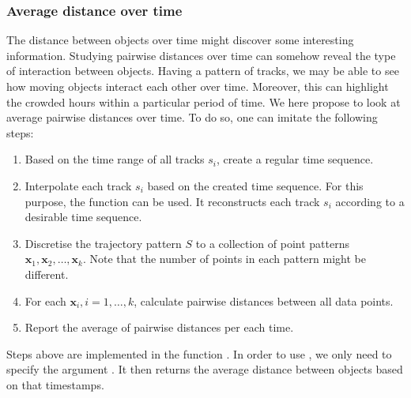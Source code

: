 \documentclass[article]{jss}
\begin{document}
\subsubsection{Average distance over time}
  The distance between objects over time might discover some interesting information. Studying pairwise distances over time can somehow reveal the type of interaction between objects. Having a pattern of tracks, we may be able to see how moving objects interact each other over time. Moreover, this can highlight the crowded hours within a particular period of time. We here propose to look at average pairwise distances over time. To do so, one can imitate the following steps:
  \begin{leftbar}
  \begin{enumerate}
  \item Based on the time range of all tracks $s_i$, create a regular time sequence.
  \item Interpolate each track $s_i$ based on the created time sequence. For this purpose, the function  can be used. It reconstructs each track $s_i$ according to a desirable time sequence.
  \item Discretise the trajectory pattern $S$ to a collection of point patterns $\mathbf{x}_1,\mathbf{x}_2, \ldots, \mathbf{x}_k$. Note that the number of points in each pattern might be different.
  \item For each $\mathbf{x}_i ,i=1,\ldots,k$, calculate pairwise distances between all data points.
  \item Report the average of pairwise distances per each time.
  \end{enumerate}
  \end{leftbar}
  Steps above are implemented in the function . In order to use , we only need to specify the argument . It then returns the average distance between objects based on that timestamps. 
\end{document}
